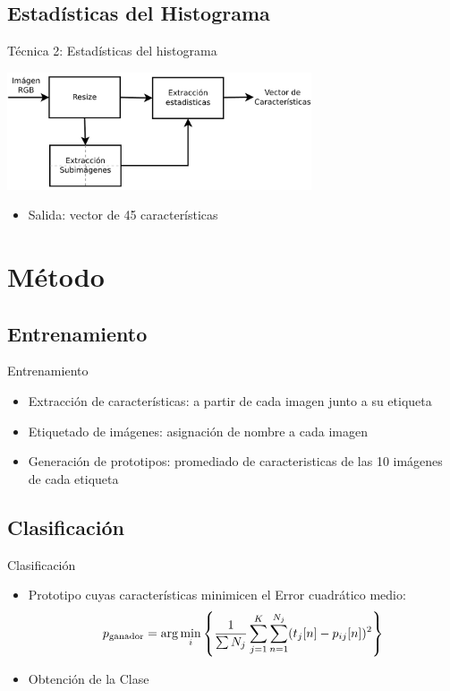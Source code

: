 \documentclass[spanish]{beamer}
\begin{document}
\subsection{Estadísticas del Histograma}
\begin{frame}{Técnica 2: Estadísticas del histograma}
 \begin{center}
   \includegraphics[width=9cm]{../diagramas/procesoestadisticas}
 \end{center}
 \begin{itemize}
 \item Salida: vector de 45 características
 \end{itemize} 
\end{frame}
%
\section{Método}
%
\subsection{Entrenamiento}
\begin{frame}{Entrenamiento}
  \begin{itemize}
  \item Extracción de características: a partir de cada imagen junto a su etiqueta
  \item Etiquetado de imágenes: asignación de nombre a cada imagen
  \item Generación de prototipos: promediado de caracteristicas de las 10 
    imágenes de cada etiqueta
  \end{itemize}
\end{frame}
%
\subsection{Clasificación}
\begin{frame}{Clasificación}
  \begin{itemize}
  \item Prototipo cuyas características minimicen el Error cuadrático medio:
\begin{equation}
  p_{\textrm{ganador}}=\arg \min_i\left\{ \frac{1}{\sum N_j}
                \sum_{j=1}^K\sum_{n=1}^{N_j}(t_j[n]-p_{ij}[n])^2\right\}
\end{equation}
\item Obtención de la Clase
  \end{itemize}
\end{frame}
%
\end{document}
